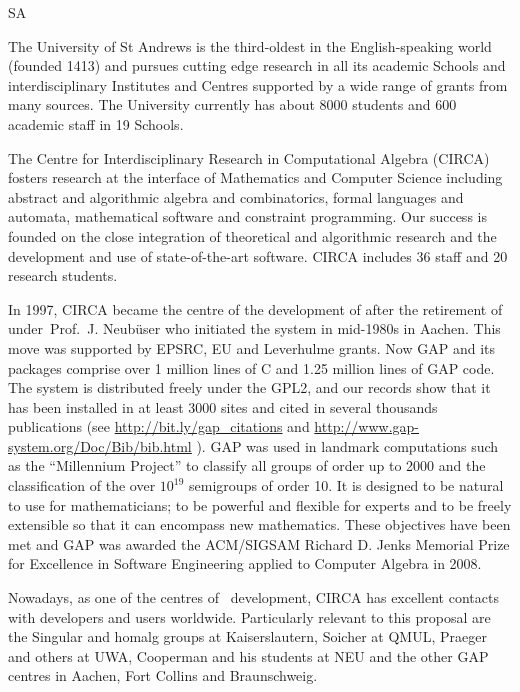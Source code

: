 \begin{sitedescription}{SA}

% 


The University of St Andrews is the third-oldest in the
English-speaking world (founded 1413) and pursues cutting edge
research in all its academic Schools and interdisciplinary Institutes
and Centres supported by a wide range of grants from many sources. 
The University currently has about 8000 students and 600
academic staff in 19 Schools.

The Centre for Interdisciplinary Research in Computational Algebra (CIRCA)
fosters research at the interface of Mathematics and Computer Science including
abstract and algorithmic algebra and combinatorics, formal languages and
automata, mathematical software and constraint programming. Our success is 
founded on the close integration of theoretical and algorithmic research and 
the development and use of state-of-the-art software. CIRCA includes
36 staff and 20 research students.

In 1997, CIRCA became the centre of the development of \GAP after the 
retirement of under~Prof.~J. Neub\"user who initiated the system in 
mid-1980s in Aachen. This move was supported by EPSRC, EU and Leverhulme 
grants. Now GAP and its packages comprise over 1 million lines of C and 
1.25 million lines of GAP code. The system is distributed freely under the GPL2,
and our records show that it has been installed in at least 3000 sites and 
cited in several thousands publications 
(see \url{http://bit.ly/gap_citations} and \url{http://www.gap-system.org/Doc/Bib/bib.html} ). 
GAP was used in landmark computations such as the ``Millennium Project'' 
to classify all groups of order up to 2000 
and the classification of the over $10^{19}$ semigroups of order 10. It is 
designed to be natural to use for mathematicians; to be powerful and flexible 
for experts and to be freely extensible so that it can encompass new mathematics. 
These objectives have been met and GAP was awarded the ACM/SIGSAM Richard D. Jenks
Memorial Prize for Excellence in Software Engineering applied to Computer Algebra in 2008.

Nowadays, as one of the centres of \GAP\ development, CIRCA has
excellent contacts with developers and users worldwide. Particularly 
relevant to this proposal are the Singular and homalg groups at 
Kaiserslautern, Soicher at QMUL, Praeger and others at UWA, Cooperman 
and his students at NEU and the other GAP centres in Aachen, Fort Collins 
and Braunschweig.


\end{sitedescription}
